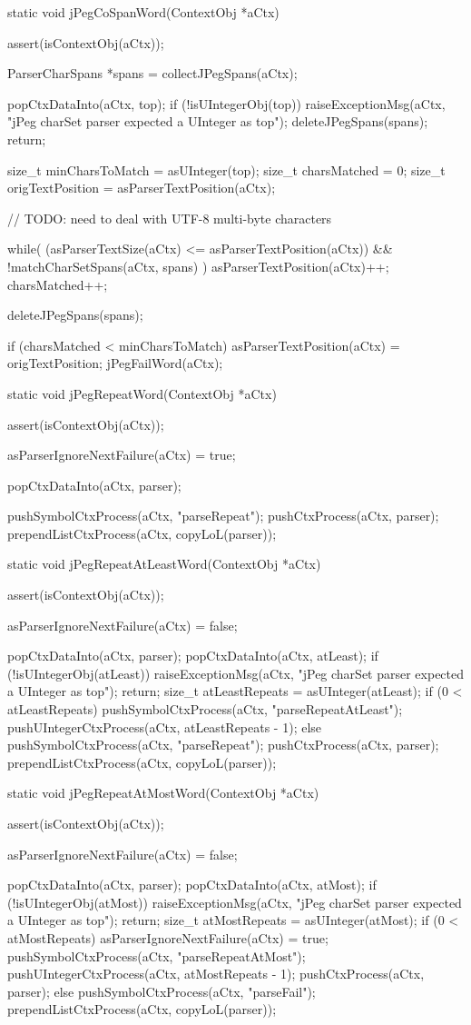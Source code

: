 static void jPegCoSpanWord(ContextObj *aCtx) {
  assert(isContextObj(aCtx));
  
  ParserCharSpans *spans = collectJPegSpans(aCtx);
  
  popCtxDataInto(aCtx, top);
  if (!isUIntegerObj(top)) {
    raiseExceptionMsg(aCtx,
      "jPeg charSet parser expected a UInteger as top");
    deleteJPegSpans(spans);
    return;
  }
  
  size_t minCharsToMatch  = asUInteger(top);
  size_t charsMatched     = 0;
  size_t origTextPosition = asParserTextPosition(aCtx);
  
  // TODO: need to deal with UTF-8 multi-byte characters
  
  while(
    (asParserTextSize(aCtx) <= asParserTextPosition(aCtx)) &&
    !matchCharSetSpans(aCtx, spans)
  ) {
    asParserTextPosition(aCtx)++;
    charsMatched++;
  }

  deleteJPegSpans(spans);

  if (charsMatched < minCharsToMatch) {
    asParserTextPosition(aCtx) = origTextPosition;
    jPegFailWord(aCtx);
  }
}

static void jPegRepeatWord(ContextObj *aCtx) {
  assert(isContextObj(aCtx));
  
  asParserIgnoreNextFailure(aCtx) = true;
  
  popCtxDataInto(aCtx, parser);
  
  pushSymbolCtxProcess(aCtx, "parseRepeat");
  pushCtxProcess(aCtx, parser);
  prependListCtxProcess(aCtx, copyLoL(parser));
}

static void jPegRepeatAtLeastWord(ContextObj *aCtx) {
  assert(isContextObj(aCtx));
  
  asParserIgnoreNextFailure(aCtx) = false;
  
  popCtxDataInto(aCtx, parser);
  popCtxDataInto(aCtx, atLeast);
  if (!isUIntegerObj(atLeast)) {
    raiseExceptionMsg(aCtx,
      "jPeg charSet parser expected a UInteger as top");
    return;
  }
  size_t atLeastRepeats = asUInteger(atLeast);
  if (0 < atLeastRepeats) {
    pushSymbolCtxProcess(aCtx, "parseRepeatAtLeast");
    pushUIntegerCtxProcess(aCtx, atLeastRepeats - 1);
  } else {
    pushSymbolCtxProcess(aCtx, "parseRepeat");
  }
  pushCtxProcess(aCtx, parser);
  prependListCtxProcess(aCtx, copyLoL(parser));
}

static void jPegRepeatAtMostWord(ContextObj *aCtx) {
  assert(isContextObj(aCtx));
  
  asParserIgnoreNextFailure(aCtx) = false;
  
  popCtxDataInto(aCtx, parser);
  popCtxDataInto(aCtx, atMost);
  if (!isUIntegerObj(atMost)) {
    raiseExceptionMsg(aCtx,
      "jPeg charSet parser expected a UInteger as top");
    return;
  }
  size_t atMostRepeats = asUInteger(atMost);
  if (0 < atMostRepeats) {
    asParserIgnoreNextFailure(aCtx) = true;
    pushSymbolCtxProcess(aCtx, "parseRepeatAtMost");
    pushUIntegerCtxProcess(aCtx, atMostRepeats - 1);
    pushCtxProcess(aCtx, parser);
  } else {
    pushSymbolCtxProcess(aCtx, "parseFail");
  }
  prependListCtxProcess(aCtx, copyLoL(parser));
}
\stopCCode

